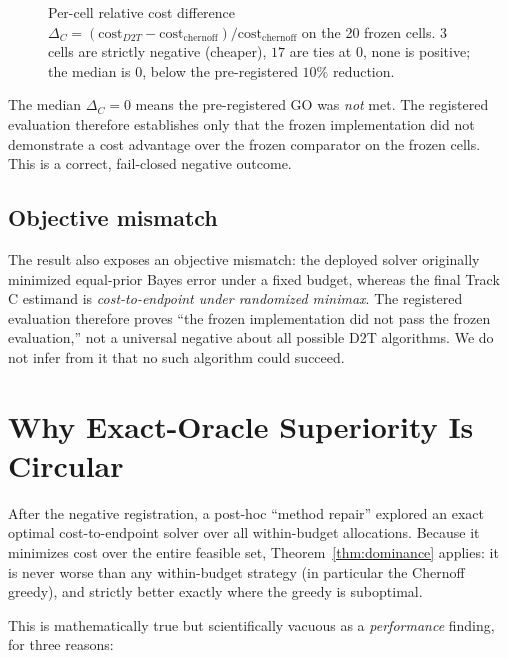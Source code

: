 \documentclass[11pt]{article}
\begin{document}
\begin{figure}[H]\centering

\caption{Per-cell relative cost difference $\Delta_C = (\mathrm{cost}_{D2T}-\mathrm{cost}_{\mathrm{chernoff}})/\mathrm{cost}_{\mathrm{chernoff}}$ on the 20 frozen cells. $3$ cells are strictly negative (cheaper), $17$ are ties at $0$, none is positive; the median is $0$, below the pre-registered $10\%$ reduction.}\label{fig:delta}
\end{figure}

The median $\Delta_C=0$ means the pre-registered GO was \emph{not} met. The registered evaluation therefore establishes only that the frozen implementation did not demonstrate a cost advantage over the frozen comparator on the frozen cells. This is a correct, fail-closed negative outcome.

\subsection{Objective mismatch}\label{sec:mismatch}

The result also exposes an objective mismatch: the deployed solver originally minimized equal-prior Bayes error under a fixed budget, whereas the final Track C estimand is \emph{cost-to-endpoint under randomized minimax}. The registered evaluation therefore proves ``the frozen implementation did not pass the frozen evaluation,'' not a universal negative about all possible D2T algorithms. We do not infer from it that no such algorithm could succeed.

\section{Why Exact-Oracle Superiority Is Circular}\label{sec:circular}

After the negative registration, a post-hoc ``method repair'' explored an exact optimal cost-to-endpoint solver over all within-budget allocations. Because it minimizes cost over the entire feasible set, Theorem~\ref{thm:dominance} applies: it is never worse than any within-budget strategy (in particular the Chernoff greedy), and strictly better exactly where the greedy is suboptimal.

This is mathematically true but scientifically vacuous as a \emph{performance} finding, for three reasons:
\end{document}

